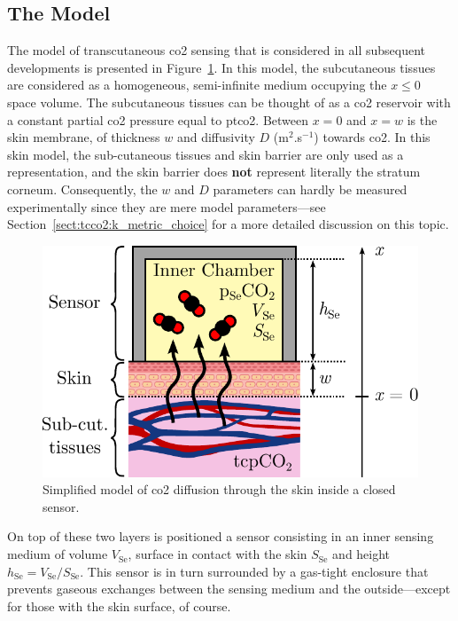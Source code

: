 \subsection{The Model}\label{sect:tcco2:model}

The model of transcutaneous \gls{co2} sensing that is considered in all subsequent developments is presented in Figure~\ref{fig:tcco2:diffusion_model}. In this model, the subcutaneous tissues are considered as a homogeneous, semi-infinite medium occupying the $x\leq 0$ space volume. The subcutaneous tissues can be thought of as a \gls{co2} reservoir with a constant partial \gls{co2} pressure equal to \gls{ptco2}. Between $x=0$ and $x=w$ is the skin membrane, of thickness $w$ and diffusivity $D$ (m$^2$.s$^{-1}$) towards \gls{co2}. In this skin model, the sub-cutaneous tissues and skin barrier are only used as a representation, and the skin barrier does \textbf{not} represent literally the stratum corneum. Consequently, the $w$ and $D$ parameters can hardly be measured experimentally since they are mere model parameters---see Section~\ref{sect:tcco2:k_metric_choice} for a more detailed discussion on this topic.

\begin{figure}
	\centering
	\includegraphics[scale=0.7]{1_main_matter/tcco2_figures/diffusion_model.pdf}
	\caption{Simplified model of \gls{co2} diffusion through the skin inside a closed sensor.}
	\label{fig:tcco2:diffusion_model}
\end{figure}

On top of these two layers is positioned a sensor consisting in an inner sensing medium of volume $V_\text{Se}$, surface in contact with the skin $S_\text{Se}$ and height $h_\text{Se} = V_\text{Se} / S_\text{Se}$. This sensor is in turn surrounded by a gas-tight enclosure that prevents gaseous exchanges between the sensing medium and the outside---except for those with the skin surface, of course.

